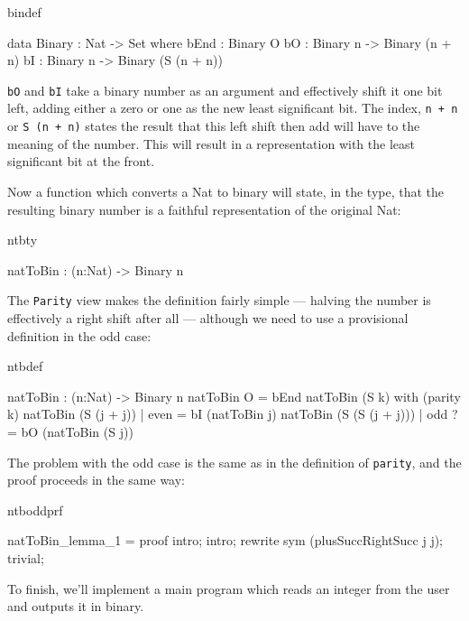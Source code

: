 \begin{SaveVerbatim}{bindef}

data Binary : Nat -> Set where
   bEnd : Binary O
   bO : Binary n -> Binary (n + n)
   bI : Binary n -> Binary (S (n + n))

\end{SaveVerbatim}

\noindent
\texttt{bO} and \texttt{bI} take a binary number as an argument and effectively shift it one bit
left, adding either a zero or one as the new least significant bit. The index,
\texttt{n + n} or \texttt{S (n + n)} states the result that this left shift then add will
have to the meaning of the number. This will result in a representation with
the least significant bit at the front.

Now a function which converts a Nat to binary will state, in the type, that the
resulting binary number is a faithful representation of the original Nat:

\begin{SaveVerbatim}{ntbty}

natToBin : (n:Nat) -> Binary n

\end{SaveVerbatim}

\noindent
The \texttt{Parity} view makes the definition fairly simple --- halving the
number is effectively a right shift after all --- although we need to use a
provisional definition in the odd case:

\begin{SaveVerbatim}{ntbdef}

natToBin : (n:Nat) -> Binary n
natToBin O = bEnd
natToBin (S k) with (parity k)
   natToBin (S (j + j))     | even  = bI (natToBin j)
   natToBin (S (S (j + j))) | odd  ?= bO (natToBin (S j))

\end{SaveVerbatim}

\noindent
The problem with the odd case is the same as in the definition of \texttt{parity}, and
the proof proceeds in the same way:

\begin{SaveVerbatim}{ntboddprf}

natToBin_lemma_1 = proof {
    intro;
    intro;
    rewrite sym (plusSuccRightSucc j j);
    trivial;
}

\end{SaveVerbatim}

\noindent
To finish, we'll implement a main program which reads an integer from the user and
outputs it in binary. 

